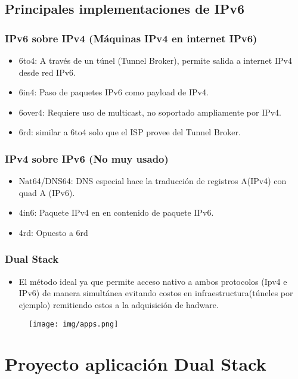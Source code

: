 \documentclass{beamer}
\begin{document}

\subsection{Principales implementaciones de IPv6}
\begin{frame}
	\frametitle{IPv6 sobre IPv4 (Máquinas IPv4 en internet IPv6)}
	\begin{itemize}[itemsep=2em]
		\item
			6to4: A través de un túnel (Tunnel Broker),
			permite salida a internet IPv4 desde red IPv6.
		\item
			6in4: Paso de paquetes IPv6 como payload de IPv4.
		\item
			6over4: Requiere uso de multicast, no soportado
			ampliamente por IPv4.
		\item
			6rd: similar a 6to4 solo que el ISP provee del 
			Tunnel Broker.
	\end{itemize}
\end{frame}

\begin{frame}
	\frametitle{IPv4 sobre IPv6 (No muy usado)}
	\begin{itemize}[itemsep=3em]
		\item
			Nat64/DNS64: DNS especial hace la traducción
			de registros A(IPv4) con quad A (IPv6).
		\item
			4in6: Paquete IPv4 en en contenido de paquete IPv6.
		\item
			4rd: Opuesto a 6rd
	\end{itemize}
\end{frame}
\begin{frame}
\frametitle{Dual Stack}
	\begin{itemize}
		\item
			El método ideal ya que permite acceso
			nativo a ambos protocolos (Ipv4 e IPv6) de manera 
			simultánea
			evitando costos en infraestructura(túneles por 
			ejemplo) remitiendo
			estos a la adquisición de hadware.
	\end{itemize}
	\begin{figure}
		\centering
		\texttt{[image: img/apps.png]}
	\end{figure}
\end{frame}


\section{Proyecto aplicación Dual Stack}
\end{document}
